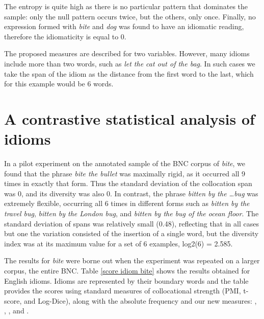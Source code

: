 \documentclass[output=paper]{langsci/langscibook}
\begin{document}


The entropy is quite high as there is no particular pattern that
dominates the sample: only the null pattern occurs twice, but the
others, only once. Finally, no expression formed with \textit{bite} and \textit{dog}
was found to have an idiomatic reading, therefore the idiomaticity is
equal to 0.



The proposed measures are described for two variables. However, many
idioms include more than two words, such as \textit{let the cat out of the
bag}. In such cases we take the span of the idiom as the distance from
the first word to the last, which for this example would be 6 words. 

\section{A contrastive statistical analysis of idioms}

In a pilot experiment on the annotated sample of the BNC corpus of
\textit{bite}, we found that the phrase \textit{bite the bullet} was maximally rigid,
as it occurred all 9 times in exactly that form. Thus the standard
deviation of the collocation span was 0, and its diversity was also 0.
In contrast, the phrase \textit{bitten by the \dots bug} was extremely flexible,
occurring all 6 times in different forms such as \textit{bitten by the travel
bug}, \textit{bitten by the London bug}, and \textit{bitten by the bug of the ocean
floor}. The standard deviation of spans was relatively small (0.48),
reflecting that in all cases but one the variation consisted of the
insertion of a single word, but the diversity index was at its maximum
value for a set of 6 examples, log2(6) = 2.585. 



The results for \textit{bite} were borne out when the experiment was repeated
on a larger corpus, the entire BNC. Table \ref{score idiom bite} shows the results obtained
for English idioms. Idioms are represented by their boundary words and
the table provides the scores using standard measures of collocational
strength (PMI, t-score, and Log-Dice), along with the absolute
frequency and our new measures: , , , and
.
\end{document}
